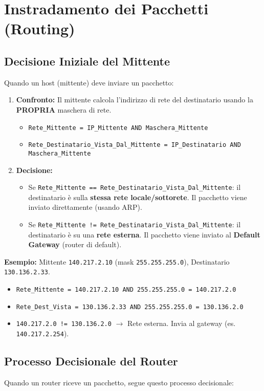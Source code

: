 \section{Instradamento dei Pacchetti (Routing)}

\subsection{Decisione Iniziale del Mittente}
Quando un host (mittente) deve inviare un pacchetto:
\begin{enumerate}
    \item \textbf{Confronto:} Il mittente calcola l'indirizzo di rete del destinatario usando la \textbf{PROPRIA} maschera di rete.
    \begin{itemize}
        \item \texttt{Rete\_Mittente = IP\_Mittente AND Maschera\_Mittente}
        \item \texttt{Rete\_Destinatario\_Vista\_Dal\_Mittente = IP\_Destinatario AND Maschera\_Mittente}
    \end{itemize}
    \item \textbf{Decisione:}
    \begin{itemize}
        \item Se \texttt{Rete\_Mittente == Rete\_Destinatario\_Vista\_Dal\_Mittente}: il destinatario è sulla \textbf{stessa rete locale/sottorete}. Il pacchetto viene inviato direttamente (usando ARP).
        \item Se \texttt{Rete\_Mittente != Rete\_Destinatario\_Vista\_Dal\_Mittente}: il destinatario è su una \textbf{rete esterna}. Il pacchetto viene inviato al \textbf{Default Gateway} (router di default).
    \end{itemize}
\end{enumerate}
\textbf{Esempio:} Mittente \texttt{140.217.2.10} (mask \texttt{255.255.255.0}), Destinatario \texttt{130.136.2.33}.
\begin{itemize}
    \item \texttt{Rete\_Mittente = 140.217.2.10 AND 255.255.255.0 = 140.217.2.0}
    \item \texttt{Rete\_Dest\_Vista = 130.136.2.33 AND 255.255.255.0 = 130.136.2.0}
    \item \texttt{140.217.2.0 != 130.136.2.0} $\rightarrow$ Rete esterna. Invia al gateway (es. \texttt{140.217.2.254}).
\end{itemize}

\subsection{Processo Decisionale del Router}
Quando un router riceve un pacchetto, segue questo processo decisionale:

